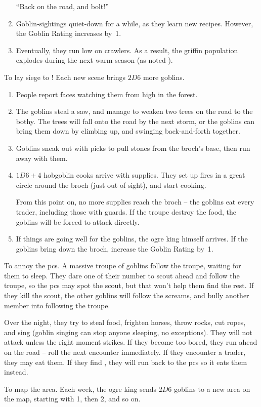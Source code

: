 \begin{multicols}{2}
\begin{dlist}
\begin{enumerate}
    ``Back on the road, and bolt!''
    \item
    Goblin-sightings quiet-down for a while, as they learn new recipes.
    However, the Goblin Rating increases by~1.
    \item
    Eventually, they run low on \glspl{crawler}.
    As a result, the griffin population explodes during the next warm season (as noted ).
  \end{enumerate}
  \item
  To lay siege to !
  Each new scene brings $2D6$ more goblins.
  \begin{enumerate}
    \item
    People report faces watching them from high in the forest.
    \item
    The goblins steal a saw, and manage to weaken two trees on the road to the \gls{bothy}.
    The trees will fall onto the road by the next storm, or the goblins can bring them down by climbing up, and swinging back-and-forth together.
    \item
    Goblins sneak out with picks to pull stones from the \gls{broch}'s base, then run away with them.
    \item
    $1D6+4$ hobgoblin cooks arrive with supplies.
    They set up fires in a great circle around the \gls{broch} (just out of sight), and start cooking.

    From this point on, no more supplies reach the \gls{broch} -- the goblins eat every trader, including those with \glspl{guard}.
    If the troupe destroy the food, the goblins will be forced to attack directly.
    \item
    If things are going well for the goblins, the \gls{ogre} king himself arrives.
    If the goblins bring down the \gls{broch}, increase the Goblin Rating by~1.
  \end{enumerate}
  \item
  To annoy the \glspl{pc}.
  A massive troupe of goblins follow the troupe, waiting for them to sleep.
  They dare one of their number to scout ahead and follow the troupe, so the \glspl{pc} may spot the scout, but that won't help them find the rest.
  If they kill the scout, the other goblins will follow the screams, and bully another member into following the troupe.

  Over the night, they try to steal food, frighten horses, throw rocks, cut ropes, and sing (goblin singing can stop anyone sleeping, no exceptions).
  They will not attack unless the right moment strikes.
  If they become too bored, they run ahead on the road -- roll the next encounter immediately.
  If they encounter a trader, they may eat them.
  If they find , they will run back to the \glspl{pc} so it eats them instead.
  \item
  To map the area.
  Each week, the \gls{ogre} king sends $2D6$ goblins to a new area on the map, starting with 1, then 2, and so on.


\end{dlist}
\end{multicols}
